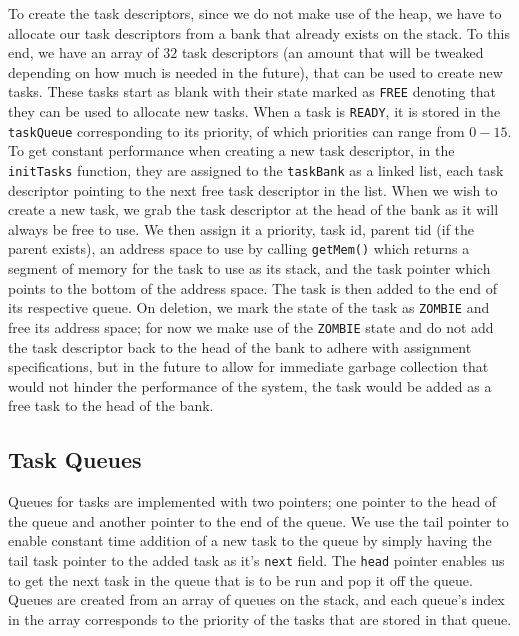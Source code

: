 \documentclass[12pt]{article}
\begin{document}
To create the task descriptors, since we do not make use of the heap, we have to allocate our task descriptors from a bank that already exists on the stack.  To this end, we have an array of $32$ task descriptors (an amount that will be tweaked depending on how much is needed in the future), that can be used to create new tasks.  These tasks start as blank with their state marked as \texttt{FREE} denoting that they can be used to allocate new tasks.  When a task is \texttt{READY}, it is stored in the \texttt{taskQueue} corresponding to its priority, of which priorities can range from $0 - 15$.  To get constant performance when creating a new task descriptor, in the \texttt{initTasks} function, they are assigned to the \texttt{taskBank} as a linked list, each task descriptor pointing to the next free task descriptor in the list.  When we wish to create a new task, we grab the task descriptor at the head of the bank as it will always be free to use.  We then assign it a priority, task id, parent tid (if the parent exists), an address space to use by calling \texttt{getMem()} which returns a segment of memory for the task to use as its stack, and the task pointer which points to the bottom of the address space.  The task is then added to the end of its respective queue.  On deletion, we mark the state of the task as \texttt{ZOMBIE} and free its address space; for now we make use of the \texttt{ZOMBIE} state and do not add the task descriptor back to the head of the bank to adhere with assignment specifications, but in the future to allow for immediate garbage collection that would not hinder the performance of the system, the task would be added as a free task to the head of the bank.

\subsection{Task Queues}
Queues for tasks are implemented with two pointers; one pointer to the head of the queue and another pointer to the end of the queue.  We use the tail pointer to enable constant time addition of a new task to the queue by simply having the tail task pointer to the added task as it's \texttt{next} field.  The \texttt{head} pointer enables us to get the next task in the queue that is to be run and pop it off the queue.  Queues are created from an array of queues on the stack, and each queue's index in the array corresponds to the priority of the tasks that are stored in that queue.
\\[1\baselineskip]
\end{document}
